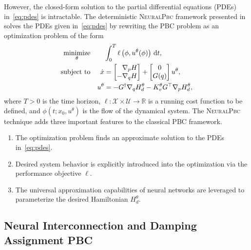 However, the closed-form solution to the partial differential
equations (PDEs) in~\eqref{eq:pdes} is intractable. The deterministic
\textsc{NeuralPbc} framework presented in~\cite{neuralpbc} solves the PDEs given
in~\eqref{eq:pdes} by rewriting the PBC problem as an optimization problem of
the form 
\begin{equation}
  \begin{aligned}
      \underset{\theta}{\textrm{minimize}} 
      & & &\int_{0}^{T} \ell \left(\phi,u^{\theta}(\phi) \right) \, \dd t , \\%
      \textrm{subject to}
      & & \dot{x} &= \bmat{\phantom{-}\nabla_p H \\ -\nabla_q H} + \bmat{0 \\ G(q)}u^{\theta}, \\%
      & & u^{\theta} &= -G^{\dagger} \nabla_q H_d^{\theta} - K_v^{\theta} G^\top \nabla_p H_d^{\theta},%
  \end{aligned}
  \label{eq:neural_pbc_finite_optim}
\end{equation}
where $T>0$ is the time horizon, $\ell: \mathcal{X} \times \mathcal{U}
\rightarrow \mathbb{R}$ is a running cost function to be defined, and $\phi(t;
x_0, u^\theta)$ is the flow of the dynamical system.
%
The \textsc{NeuralPbc} technique adds three important features to the classical 
PBC framework.
\begin{enumerate}
  \item The optimization problem finds an approximate solution to the PDEs in~\eqref{eq:pdes}.
  \item Desired system behavior is explicitly introduced into the optimization via the performance objective $\ell$.
  \item The universal approximation capabilities of neural networks are leveraged to parameterize the desired Hamiltonian $H^\theta_d$.
\end{enumerate}

\subsection{Neural Interconnection and Damping Assignment PBC}

